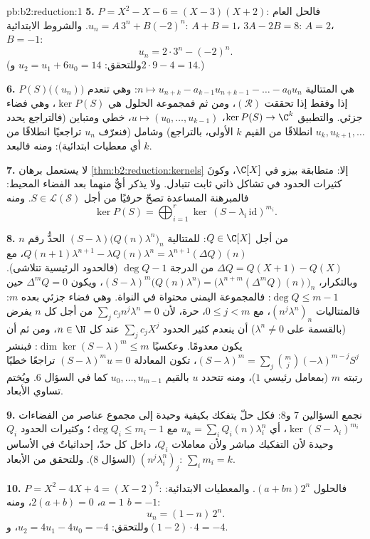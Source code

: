 \begin{solution}{pb:b2:reduction:1}
\textbf{5.} $P = X^2 - X - 6 = (X - 3)(X + 2)$: فالحل العام
$u_n = A\,3^n + B(-2)^n$. والشروط الابتدائية: $A + B = 1$، $3A -
2B = 8$: $A = 2$، $B = -1$:
\[
u_n = 2\cdot 3^n - (-2)^n .
\]
(وللتحقق: $u_2 = u_1 + 6u_0 = 14$ و$2\cdot9 - 4 = 14$.)

\textbf{6.} $P(S)\bigl((u_n)\bigr)$ هي المتتالية $n \mapsto
u_{n+k} - a_{k-1}u_{n+k-1} - \dots - a_0u_n$: وهي تنعدم إذا وفقط إذا
تحققت $(\mathcal R)$، ومن ثم فمجموعة الحلول هي $\ker P(S)$، وهي
فضاء جزئي. والتطبيق $\ker P(S) \to \C^k$، $u \mapsto (u_0, \dots,
u_{k-1})$، خطي ومتباين (فالتراجع يحدد
$u_{k}, u_{k+1}, \dots$ انطلاقًا من القيم $k$ الأولى، بالتراجع)
وشامل (فنعرّف $u_n$ تراجعيًا انطلاقًا من أي معطيات ابتدائية):
ومنه فالبعد $k$.

\textbf{7.} لا يستعمل برهان \cref{thm:b2:reduction:kernels}
إلا: متطابقة بيزو في $\C[X]$، وكونَ
كثيرات الحدود في تشاكل ذاتي ثابت تتبادل. ولا يذكر أيٌّ منهما
بعد الفضاء المحيط: فالمبرهنة المساعدة تصحّ حرفيًا من أجل
$S \in \mathcal{L}(\mathcal{S})$. ومنه
\[
\ker P(S) = \bigoplus_{i=1}^{r}
\ker\,(S - \lambda_i\,\mathrm{id})^{m_i}.
\]

\textbf{8.} من أجل $Q \in \C[X]$: للمتتالية $(S -
\lambda)\bigl(Q(n)\lambda^n\bigr)_n$ الحدُّ رقم $n$
$Q(n{+}1)\lambda^{n+1} - \lambda Q(n)\lambda^n =
\lambda^{n+1}(\Delta Q)(n)$، مع $\Delta Q = Q(X{+}1) - Q(X)$
من الدرجة $\deg Q - 1$ (فالحدود الرئيسية تتلاشى). وبالتكرار،
$(S - \lambda)^m\bigl(Q(n)\lambda^n\bigr) =
\bigl(\lambda^{n+m}(\Delta^m Q)(n)\bigr)_n$، ويكون $\Delta^m Q = 0$
حين $\deg Q \leq m - 1$: فالمجموعة اليمنى محتواة في
النواة. وهي فضاء جزئي بعده $m$: فالمتتاليات
$(n^j\lambda^n)_n$، مع $0 \leq j < m$، حرة، لأن
$\sum_j c_j n^j\lambda^n = 0$ من أجل كل $n$ يفرض (بالقسمة على
$\lambda^n \neq 0$) أن ينعدم كثير الحدود $\sum_j c_jX^j$ عند
كل $n \in \N$، ومن ثم أن يكون معدومًا. وعكسيًا $\dim\ker(S -
\lambda)^m \leq m$: فبنشر $(S - \lambda)^m = \sum_j
\binom mj(-\lambda)^{m-j}S^j$، تكون المعادلة $(S - \lambda)^m u =
0$ تراجعًا خطيًا رتبته $m$ (بمعامل رئيسي
$1$)، ومنه تتحدد $u$ بالقيم $u_0, \dots, u_{m-1}$ كما في
السؤال 6. ويُختم تساوي الأبعاد.

\textbf{9.} نجمع السؤالين 7 و8: فكل حلّ يتفكك
بكيفية وحيدة إلى مجموع عناصر من الفضاءات $\ker(S -
\lambda_i)^{m_i}$، أي $u_n = \sum_i Q_i(n)\lambda_i^n$ مع
$\deg Q_i \leq m_i - 1$؛ وكثيرات الحدود $Q_i$ وحيدة لأن
التفكيك مباشر ولأن معاملات $Q_i$، داخل كل حدّ،
إحداثياتٌ في الأساس $(n^j\lambda_i^n)_j$ (السؤال 8). وللتحقق من الأبعاد:
$\sum_i m_i = k$.

\textbf{10.} $P = X^2 - 4X + 4 = (X - 2)^2$: فالحلول $(a +
bn)2^n$. والمعطيات الابتدائية: $a = 1$، $2(a + b) = 0$، ومنه $b = -1$:
\[
u_n = (1 - n)\,2^n .
\]
وللتحقق: $u_2 = 4u_1 - 4u_0 = -4$، و$(1 - 2)\cdot4 = -4$.


\end{solution}

